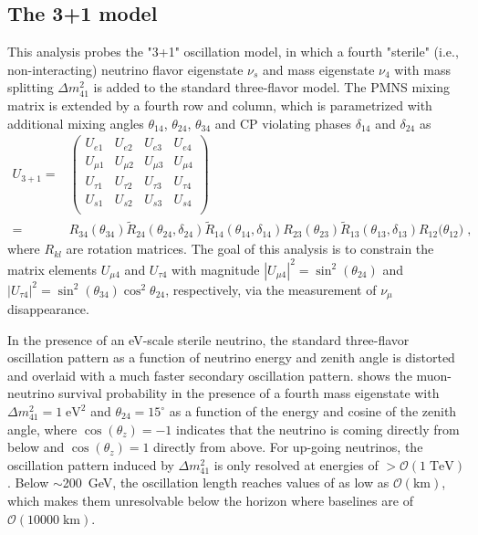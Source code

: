 \subsection{The 3+1 model}
This analysis probes the "3+1" oscillation model, in which a fourth "sterile" (i.e., non-interacting) neutrino flavor eigenstate $\nu_s$ and mass eigenstate $\nu_4$ with mass splitting $\Delta m^2_{41}$ is added to the standard three-flavor model.
The PMNS mixing matrix is extended by a fourth row and column, which is parametrized with additional mixing angles $\theta_{14}$, $\theta_{24}$, $\theta_{34}$ and CP violating phases $\delta_{14}$ and $\delta_{24}$ as
\begin{equation}
\begin{aligned}
    U_{3+1} =&\begin{pmatrix}
    U_{e1}    & U_{e2}    & U_{e3}   &U_{e4}    \\
    U_{\mu1}  & U_{\mu2}  & U_{\mu3} &U_{\mu4}  \\
    U_{\tau1} & U_{\tau2} & U_{\tau3}&U_{\tau4} \\
    U_{s1} & U_{s2} & U_{s3}&U_{s4} \\
    \end{pmatrix}\\
    =&
    R_{34}(\theta_{34})
    \tilde{R}_{24}(\theta_{24}, \delta_{24})
    \tilde{R}_{14}(\theta_{14}, \delta_{14})
    R_{23}(\theta_{23})
    \tilde{R}_{13}(\theta_{13}, \delta_{13})
    R_{12}({\theta_{12})}\;,
\end{aligned}\label{eq:pmns-3+1}
\end{equation}
where $R_{kl}$ are rotation matrices.
The goal of this analysis is to constrain the matrix elements $U_{\mu4}$ and $U_{\tau4}$ with magnitude $|U_{\mu4}|^2=\sin^2(\theta_{24})$ and  $|U_{\tau4}|^2=\sin^2(\theta_{34})\cos^2\theta_{24}$, respectively, via the measurement of $\nu_\mu$ disappearance.

In the presence of an eV-scale sterile neutrino, the standard three-flavor oscillation pattern as a function of neutrino energy and zenith angle is distorted and overlaid with a much faster secondary oscillation pattern.
 shows the muon-neutrino survival probability in the presence of a fourth mass eigenstate with $\Delta m^2_{41}=1\;\mathrm{eV^2}$ and $\theta_{24}=15^\circ$ as a function of the energy and cosine of the zenith angle, where $\cos(\theta_z)=-1$ indicates that the neutrino is coming directly from below and $\cos(\theta_z)=1$ directly from above.
For up-going neutrinos, the oscillation pattern induced by $\Delta m^2_{41}$ is only resolved at energies of $>\mathcal{O}(1\;\mathrm{TeV})$.
Below $\sim$200~GeV, the oscillation length reaches values of as low as $\mathcal{O}(\mathrm{km})$, which makes them unresolvable below the horizon where baselines are of $\mathcal{O}(10000\;\mathrm{km})$.


